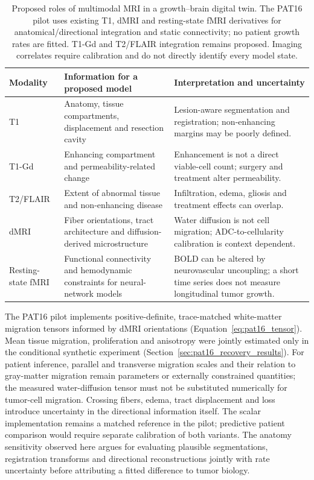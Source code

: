\begin{table}[tbp]
\centering\small
\caption{Proposed roles of multimodal MRI in a growth--brain digital twin. The PAT16 pilot uses existing T1, dMRI and resting-state fMRI derivatives for anatomical/directional integration and static connectivity; no patient growth rates are fitted. T1-Gd and T2/FLAIR integration remains proposed. Imaging correlates require calibration and do not directly identify every model state.}\label{tab:multimodal}
\begin{tabularx}{\textwidth}{>{\raggedright\arraybackslash}p{}YY}
\toprule Modality & Information for a proposed model & Interpretation and uncertainty\\\midrule
T1 & Anatomy, tissue compartments, displacement and resection cavity & Lesion-aware segmentation and registration; non-enhancing margins may be poorly defined.\\
T1-Gd & Enhancing compartment and permeability-related change & Enhancement is not a direct viable-cell count; surgery and treatment alter permeability.\\
T2/FLAIR & Extent of abnormal tissue and non-enhancing disease & Infiltration, edema, gliosis and treatment effects can overlap.\\
dMRI & Fiber orientations, tract architecture and diffusion-derived microstructure & Water diffusion is not cell migration; ADC-to-cellularity calibration is context dependent.\\
Resting-state fMRI & Functional connectivity and hemodynamic constraints for neural-network models & BOLD can be altered by neurovascular uncoupling; a short time series does not measure longitudinal tumor growth.\\\bottomrule
\end{tabularx}
\end{table}

The PAT16 pilot implements positive-definite, trace-matched white-matter migration tensors informed by dMRI orientations (Equation~\eqref{eq:pat16_tensor}). Mean tissue migration, proliferation and anisotropy were jointly estimated only in the conditional synthetic experiment (Section~\ref{sec:pat16_recovery_results}). For patient inference, parallel and transverse migration scales and their relation to gray-matter migration remain parameters or externally constrained quantities; the measured water-diffusion tensor must not be substituted numerically for tumor-cell migration. Crossing fibers, edema, tract displacement and loss introduce uncertainty in the directional information itself. The scalar implementation remains a matched reference in the pilot; predictive patient comparison would require separate calibration of both variants. The anatomy sensitivity observed here argues for evaluating plausible segmentations, registration transforms and directional reconstructions jointly with rate uncertainty before attributing a fitted difference to tumor biology.

